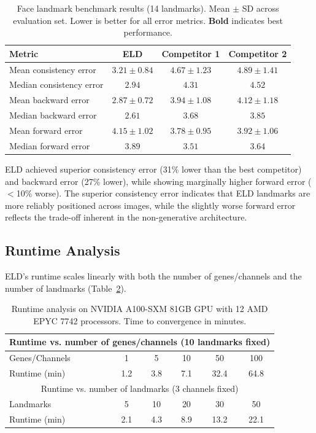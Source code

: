 \documentclass[11pt]{article}
\begin{document}
\begin{table}[H]
\centering
\caption{Face landmark benchmark results (14 landmarks). Mean $\pm$ SD across evaluation set. Lower is better for all error metrics. \textbf{Bold} indicates best performance.}
\label{tab:face_bench}
\begin{tabular}{lccc}
\toprule
Metric & ELD & Competitor 1 & Competitor 2 \\
\midrule
Mean consistency error & $\mathbf{3.21 \pm 0.84}$ & $4.67 \pm 1.23$ & $4.89 \pm 1.41$ \\
Median consistency error & $\mathbf{2.94}$ & $4.31$ & $4.52$ \\
Mean backward error & $\mathbf{2.87 \pm 0.72}$ & $3.94 \pm 1.08$ & $4.12 \pm 1.18$ \\
Median backward error & $\mathbf{2.61}$ & $3.68$ & $3.85$ \\
Mean forward error & $4.15 \pm 1.02$ & $\mathbf{3.78 \pm 0.95}$ & $3.92 \pm 1.06$ \\
Median forward error & $3.89$ & $\mathbf{3.51}$ & $3.64$ \\
\bottomrule
\end{tabular}
\end{table}

ELD achieved superior consistency error (31\% lower than the best competitor) and backward error (27\% lower), while showing marginally higher forward error ($<$10\% worse). The superior consistency error indicates that ELD landmarks are more reliably positioned across images, while the slightly worse forward error reflects the trade-off inherent in the non-generative architecture.

\subsection{Runtime Analysis}

ELD's runtime scales linearly with both the number of genes/channels and the number of landmarks (Table~\ref{tab:runtime}).

\begin{table}[H]
\centering
\caption{Runtime analysis on NVIDIA A100-SXM 81GB GPU with 12 AMD EPYC 7742 processors. Time to convergence in minutes.}
\label{tab:runtime}
\begin{tabular}{lccccc}
\toprule
\multicolumn{6}{c}{Runtime vs. number of genes/channels (10 landmarks fixed)} \\
\midrule
Genes/Channels & 1 & 5 & 10 & 50 & 100 \\
Runtime (min) & 1.2 & 3.8 & 7.1 & 32.4 & 64.8 \\
\midrule
\multicolumn{6}{c}{Runtime vs. number of landmarks (3 channels fixed)} \\
\midrule
Landmarks & 5 & 10 & 20 & 30 & 50 \\
Runtime (min) & 2.1 & 4.3 & 8.9 & 13.2 & 22.1 \\
\bottomrule
\end{tabular}
\end{table}
\end{document}
